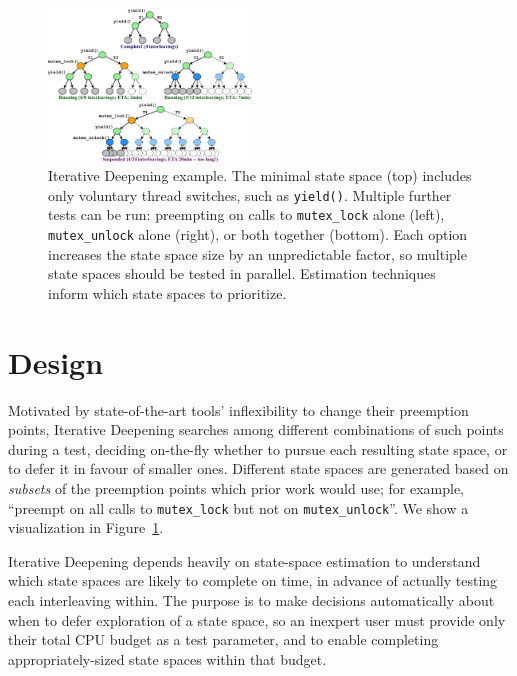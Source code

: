 \begin{figure}[t]
	\includegraphics[width=0.48\textwidth]{trees.pdf}
	\caption{Iterative Deepening example.
		The minimal state space (top) includes only voluntary thread switches, such as {\tt yield()}. %
		Multiple further tests can be run: preempting on calls to {\tt mutex\_lock} alone (left), {\tt mutex\_unlock} alone (right), or both together (bottom).
Each option increases the state space size by an unpredictable factor, so multiple state spaces should be tested in parallel.
Estimation techniques~\cite{estimation} inform which state spaces to prioritize.
}
	\label{fig:id}
\end{figure}
\section{Design}
\label{sec:design}

Motivated by state-of-the-art tools' inflexibility to change their preemption points,
Iterative Deepening searches among different combinations of such points during a test,
deciding on-the-fly whether to pursue each resulting state space, or to defer it in favour of smaller ones.
Different state spaces are generated based on {\em subsets} of the preemption points which prior work would use; for example, ``preempt on all calls to {\tt mutex\_lock} but not on {\tt mutex\_unlock}''.
We show a visualization in Figure~\ref{fig:id}.

Iterative Deepening depends heavily on state-space estimation \cite{estimation}
to understand which state spaces are likely to complete on time,
in advance of actually testing each interleaving within.
The purpose is to make decisions automatically about when to defer exploration of a state space,
so an inexpert user must provide only their total CPU budget as a test parameter,
and to enable completing appropriately-sized state spaces within that budget.

